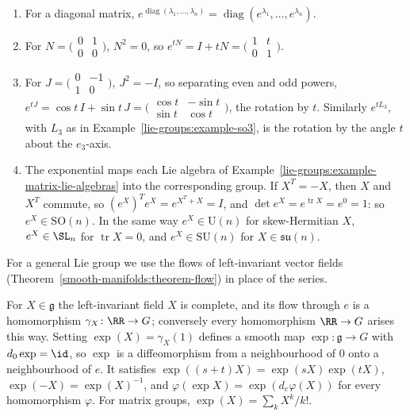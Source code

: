 \begin{example}\label{lie-groups:example-exponentials}
\begin{enumerate}
\item For a diagonal matrix, $e^{\operatorname{diag}(\lambda_1, \ldots, \lambda_n)} = \operatorname{diag}(e^{\lambda_1}, \ldots, e^{\lambda_n})$.
\item For $N = \bigl(\begin{smallmatrix}0 & 1\\ 0 & 0\end{smallmatrix}\bigr)$, $N^2 = 0$, so $e^{tN} = I + tN = \bigl(\begin{smallmatrix}1 & t\\ 0 & 1\end{smallmatrix}\bigr)$.
\item For $J = \bigl(\begin{smallmatrix}0 & -1\\ 1 & 0\end{smallmatrix}\bigr)$, $J^2 = -I$, so separating even and odd powers,
$e^{tJ} = \cos t\,I + \sin t\,J = \bigl(\begin{smallmatrix}\cos t & -\sin t\\ \sin t & \cos t\end{smallmatrix}\bigr)$, the rotation by $t$. Similarly
$e^{tL_3}$, with $L_3$ as in Example~\ref{lie-groups:example-so3}, is the rotation by the angle $t$ about the $e_3$-axis.
\item The exponential maps each Lie algebra of Example~\ref{lie-groups:example-matrix-lie-algebras} into the corresponding group. If $X^T = -X$, then $X$ and
$X^T$ commute, so $(e^X)^Te^X = e^{X^T + X} = I$, and $\det e^X = e^{\operatorname{tr}X} = e^0 = 1$: so $e^X \in \mathrm{SO}(n)$. In the same way $e^X \in \mathrm{U}(n)$
for skew-Hermitian $X$, $e^X \in \SL_n$ for $\operatorname{tr}X = 0$, and $e^X \in \mathrm{SU}(n)$ for $X \in \mathfrak{su}(n)$.
\end{enumerate}
\end{example}

For a general Lie group we use the flows of left-invariant vector fields (Theorem~\ref{smooth-manifolds:theorem-flow}) in place of the series.

\begin{theorem}\label{lie-groups:theorem-exponential}
For $X \in \mathfrak{g}$ the left-invariant field $X$ is complete, and its flow through $e$ is a homomorphism $\gamma_X \colon \RR \to G$; conversely every homomorphism $\RR \to G$ arises this way. Setting
$\exp(X) = \gamma_X(1)$ defines a smooth map $\exp \colon \mathfrak{g} \to G$ with $d_0\exp = \id$, so $\exp$ is a diffeomorphism from a neighbourhood of $0$ onto a neighbourhood of $e$. It satisfies
$\exp((s + t)X) = \exp(sX)\exp(tX)$, $\exp(-X) = \exp(X)^{-1}$, and $\varphi(\exp X) = \exp(d_e\varphi(X))$ for every homomorphism $\varphi$. For matrix groups, $\exp(X) = \sum_kX^k/k!$.
\end{theorem}

